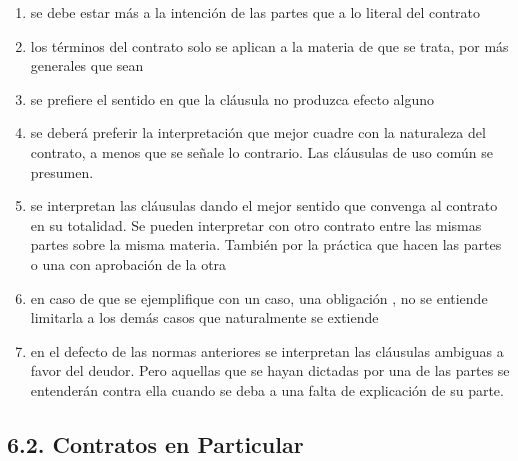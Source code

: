 \documentclass[]{article}
\providecommand{\tightlist}{%
  \setlength{\itemsep}{0pt}\setlength{\parskip}{0pt}}
\begin{document}
\begin{itemize}
  \begin{enumerate}
  \def\labelenumi{\arabic{enumi}.}
  \tightlist
  \item
    se debe estar más a la intención de las partes que a lo literal del
    contrato
  \item
    los términos del contrato solo se aplican a la materia de que se
    trata, por más generales que sean
  \item
    se prefiere el sentido en que la cláusula no produzca efecto alguno
  \item
    se deberá preferir la interpretación que mejor cuadre con la
    naturaleza del contrato, a menos que se señale lo contrario. Las
    cláusulas de uso común se presumen.
  \item
    se interpretan las cláusulas dando el mejor sentido que convenga al
    contrato en su totalidad. Se pueden interpretar con otro contrato
    entre las mismas partes sobre la misma materia. También por la
    práctica que hacen las partes o una con aprobación de la otra
  \item
    en caso de que se ejemplifique con un caso, una obligación , no se
    entiende limitarla a los demás casos que naturalmente se extiende
  \item
    en el defecto de las normas anteriores se interpretan las cláusulas
    ambiguas a favor del deudor. Pero aquellas que se hayan dictadas por
    una de las partes se entenderán contra ella cuando se deba a una
    falta de explicación de su parte.
  \end{enumerate}
\end{itemize}

\hypertarget{contratos-en-particular}{%
\subsection{6.2. Contratos en
Particular}\label{contratos-en-particular}}
\end{document}
